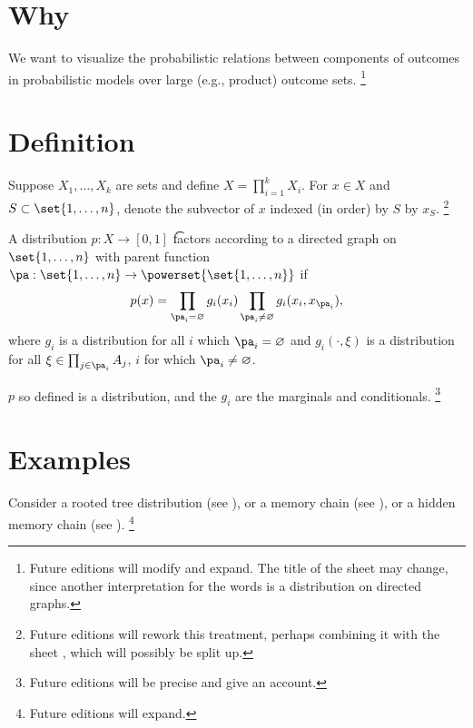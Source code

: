 
\section*{Why}

We want to visualize the probabilistic relations between components of outcomes in probabilistic models over large (e.g., product) outcome sets.
  \ifhmode\unskip\fi\footnote{
Future editions will modify and expand. The title of the sheet may change, since another interpretation for the words  is a distribution on directed graphs.
  }

\section*{Definition}

Suppose $X_1, \dots , X_k$ are sets and define $X = \prod_{i = 1}^k X_i$.
For $x \in X$ and $S \subset \set{1, \dots , n}$, denote the subvector of $x$ indexed (in order) by $S$ by $x_S$.
  \ifhmode\unskip\fi\footnote{
Future editions will rework this treatment, perhaps combining it with the sheet , which will possibly be split up.
  }

A distribution $p: X \to [0, 1]$ \t{factors according to a directed graph} on $\set{1, \dots , n}$ with parent function $\pa: \set{1,\dots ,n} \to \powerset{\set{1, \dots , n}}$ if
  \[
p(x) = \prod_{\pa_i = \varnothing} g_i(x_i) \prod_{\pa_i \neq \varnothing} g_{i}(x_i, x_{\pa_i}),
  \]
where $g_i$ is a distribution for all $i$ which $\pa_i = \varnothing$ and $g_{i}(\cdot , \xi )$ is a distribution for all $\xi  \in \prod_{j \in \pa_i} A_j$, $i$ for which $\pa_i \neq \varnothing$.

\begin{proposition}$p$ so defined is a distribution, and the $g_i$ are the marginals and conditionals.
\ifhmode\unskip\fi\footnote{
Future editions will be precise and give an account.
}\end{proposition}
\section*{Examples}

Consider a rooted tree distribution (see ), or a memory chain (see ), or a hidden memory chain (see ).
  \ifhmode\unskip\fi\footnote{
Future editions will expand.
  }
